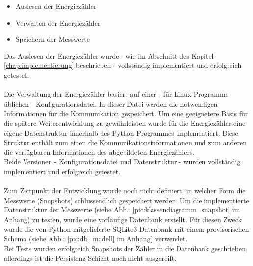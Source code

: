 \documentclass[Bachelorarbeit.tex]{subfiles}
\begin{document}
\begin{itemize}
\item Auslesen der Energiezähler
\item Verwalten der Energiezähler 
\item Speichern der Messwerte
\end{itemize}
Das Auslesen der Energiezähler wurde - wie im Abschnitt  des Kapitel \ref{chap:implementierung} beschrieben - vollständig implementiert und erfolgreich getestet.\\
\\
Die Verwaltung der Energiezähler basiert auf einer - für Linux-Programme üblichen - Konfigurationsdatei. In dieser Datei werden die notwendigen Informationen für die Kommunikation gespeichert. 
Um eine geeignetere Basis für die spätere Weiterentwicklung zu gewährleisten wurde für die Energiezähler eine eigene Datenstruktur innerhalb des Python-Programmes implementiert. 
Diese Struktur enthält zum einen die Kommunikationsinformationen und zum anderen die verfügbaren Informationen des abgebildeten Energiezählers. \\
Beide Versionen - Konfigurationsdatei und Datenstruktur - wurden vollständig implementiert und erfolgreich getestet.\\ 
\\
Zum Zeitpunkt der Entwicklung wurde noch nicht definiert, in welcher Form die Messwerte (Snapshots) schlussendlich gespeichert werden. 
Um die implementierte Datenstruktur der Messwerte (siehe Abb.: \ref{pic:klassendiagramm_snapshot} im Anhang) zu testen, wurde eine vorläufige Datenbank erstellt. 
Für diesen Zweck wurde die von Python mitgelieferte SQLite3 Datenbank mit einem provisorischen Schema (siehe Abb.: \ref{pic:db_modell} im Anhang) verwendet. \\
Bei Tests wurden erfolgreich Snapshots der Zähler in die Datenbank geschrieben, allerdings ist die Persistenz-Schicht noch nicht ausgereift.  
 
\end{document}
